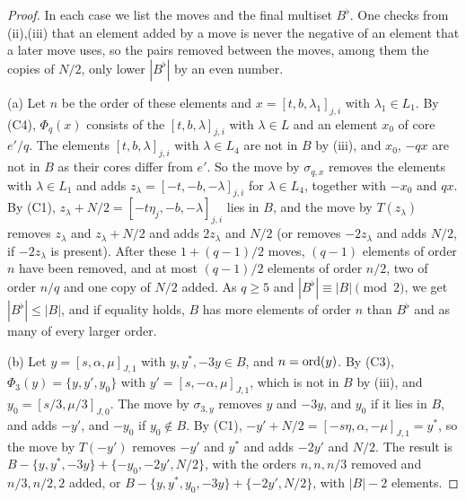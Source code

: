 \begin{proof}
In each case we list the moves and the final multiset $B^{\flat}$. One checks
from (ii),(iii) that an element added by a move is never
the negative of an element that a later move uses, so the pairs removed
between the moves, among them the copies of $N/2$, only lower $|B^{\flat}|$
by an even number.

(a) Let $n$ be the order of these elements and $x=[t,b,\lambda_{1}]_{j,i}$
with $\lambda_{1}\in L_{1}$. By (C4), $\Phi_{q}(x)$ consists of the
$[t,b,\lambda]_{j,i}$ with $\lambda\in L$ and an element $x_{0}$ of core
$e'/q$. The elements $[t,b,\lambda]_{j,i}$ with $\lambda\in L_{4}$ are not in
$B$ by (iii), and $x_{0}$, $-qx$ are not in $B$ as their
cores differ from $e'$. So the move by $\sigma_{q,x}$ removes the elements
with $\lambda\in L_{1}$ and adds $z_{\lambda}=[-t,-b,-\lambda]_{j,i}$ for
$\lambda\in L_{4}$, together with $-x_{0}$ and $qx$. By (C1),
$z_{\lambda}+N/2=[-t\eta_{j},-b,-\lambda]_{j,i}$ lies in $B$, and the move by
$T(z_{\lambda})$ removes $z_{\lambda}$ and $z_{\lambda}+N/2$ and adds
$2z_{\lambda}$ and $N/2$ (or removes $-2z_{\lambda}$ and adds $N/2$, if
$-2z_{\lambda}$ is present). After these $1+(q-1)/2$ moves, $(q-1)$
elements of order $n$ have been removed, and at most $(q-1)/2$ elements of
order $n/2$, two of order $n/q$ and one copy of $N/2$ added. As $q\ge5$ and
$|B^{\flat}|\equiv|B|\pmod2$, we get $|B^{\flat}|\le|B|$, and if equality
holds, $B$ has more elements of order $n$ than $B^{\flat}$ and as many of
every larger order.

(b) Let $y=[s,\alpha,\mu]_{J,1}$ with $y,y^{*},-3y\in B$, and $n=\operatorname{ord}(y)$. By
(C3), $\Phi_{3}(y)=\{y,y',y_{0}\}$ with $y'=[s,-\alpha,\mu]_{J,1}$, which is
not in $B$ by (iii), and $y_{0}=[s/3,\mu/3]_{J,0}$. The
move by $\sigma_{3,y}$ removes $y$ and $-3y$, and $y_{0}$ if it lies in $B$,
and adds $-y'$, and $-y_{0}$ if $y_{0}\notin B$. By (C1),
$-y'+N/2=[-s\eta,\alpha,-\mu]_{J,1}=y^{*}$, so the move by $T(-y')$ removes
$-y'$ and $y^{*}$ and adds $-2y'$ and $N/2$. The result is
$B-\{y,y^{*},-3y\}+\{-y_{0},-2y',N/2\}$, with the orders $n,n,n/3$ removed and
$n/3,n/2,2$ added, or $B-\{y,y^{*},y_{0},-3y\}+\{-2y',N/2\}$, with
$|B|-2$ elements.


\end{proof}
